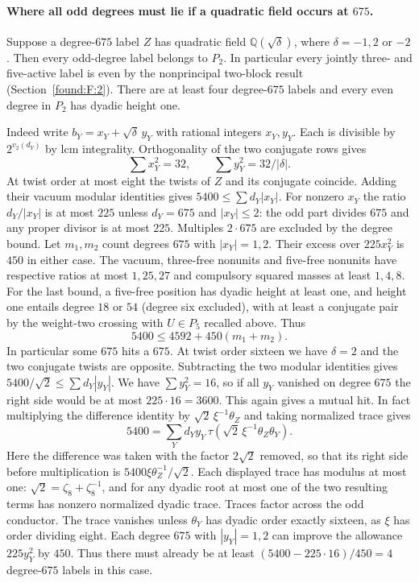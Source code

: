 \documentclass[11pt,a4paper]{article}
\numberwithin{equation}{section}
\theoremstyle{remark}
\newcommand{\QQ}{\mathbb Q}
\begin{document}
\paragraph{Where all odd degrees must lie if a quadratic field occurs at $675$.}
Suppose a degree-$675$ label $Z$ has quadratic field $\QQ(\sqrt\delta)$, where $\delta=-1,2$ or $-2$. Then every odd-degree label belongs to $P_2$. In particular every jointly three- and five-active label is even by the nonprincipal two-block result (Section~\ref{found:F:2}). There are at least four degree-$675$ labels and every even degree in $P_2$ has dyadic height one.

Indeed write $b_Y=x_Y+\sqrt\delta\,y_Y$ with rational integers $x_Y,y_Y$. Each is divisible by $2^{v_2(d_Y)}$ by lcm integrality. Orthogonality of the two conjugate rows gives
\[
                 \sum x_Y^2=32,\qquad \sum y_Y^2=32/|\delta|.
\]
At twist order at most eight the twists of $Z$ and its conjugate coincide. Adding their vacuum modular identities gives $5400\le\sum d_Y|x_Y|$. For nonzero $x_Y$ the ratio $d_Y/|x_Y|$ is at most $225$ unless $d_Y=675$ and $|x_Y|\le2$: the odd part divides $675$ and any proper divisor is at most $225$. Multiples $2\cdot675$ are excluded by the degree bound. Let $m_1,m_2$ count degrees $675$ with $|x_Y|=1,2$. Their excess over $225x_Y^2$ is $450$ in either case. The vacuum, three-free nonunits and five-free nonunits have respective ratios at most $1,25,27$ and compulsory squared masses at least $1,4,8$. For the last bound, a five-free position has dyadic height at least one, and height one entails degree $18$ or $54$ (degree six excluded), with at least a conjugate pair by the weight-two crossing with $U\in P_5$ recalled above. Thus
\[
                 5400\le4592+450(m_1+m_2).
\]
In particular some $675$ hits a $675$. At twist order sixteen we have $\delta=2$ and the two conjugate twists are opposite. Subtracting the two modular identities gives $5400/\sqrt2\le\sum d_Y|y_Y|$. We have $\sum y_Y^2=16$, so if all $y_Y$ vanished on degree $675$ the right side would be at most $225\cdot16=3600$. This again gives a mutual hit. In fact multiplying the difference identity by $\sqrt2\,\xi^{-1}\theta_Z$ and taking normalized trace gives
\[
 5400=\sum_Y d_Y y_Y\,\tau(\sqrt2\,\xi^{-1}\theta_Z\theta_Y).
\]
Here the difference was taken with the factor $2\sqrt2$ removed, so that its right side before multiplication is $5400\xi\theta_Z^{-1}/\sqrt2$. Each displayed trace has modulus at most one: $\sqrt2=\zeta_8+\zeta_8^{-1}$, and for any dyadic root at most one of the two resulting terms has nonzero normalized dyadic trace. Traces factor across the odd conductor. The trace vanishes unless $\theta_Y$ has dyadic order exactly sixteen, as $\xi$ has order dividing eight. Each degree $675$ with $|y_Y|=1,2$ can improve the allowance $225y_Y^2$ by $450$. Thus there must already be at least $(5400-225\cdot16)/450=4$ degree-$675$ labels in this case.
\end{document}

